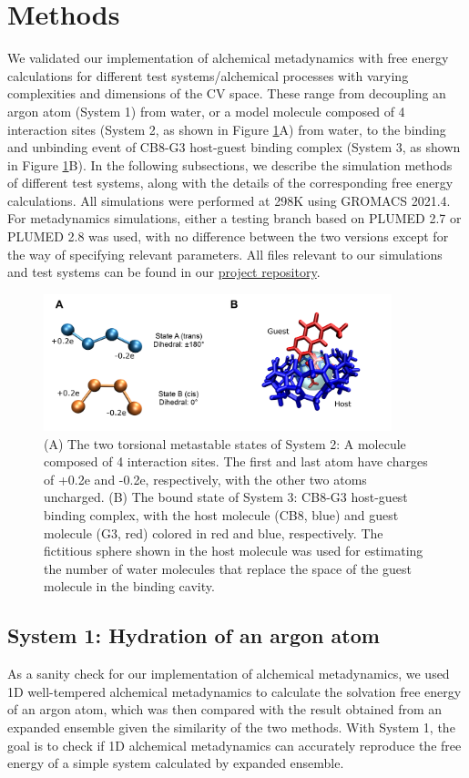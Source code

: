 \documentclass[journal=jacsat,manuscript=article]{achemso}
\begin{document}
\section{Methods}\label{methods}
We validated our implementation of alchemical metadynamics with free energy calculations for different test systems/alchemical processes with varying complexities and dimensions of the CV space. These range from decoupling an argon atom (System 1) from water, or a model molecule composed of 4 interaction sites (System 2, as shown in Figure \ref{test_sys}A) from water, to the binding and unbinding event of CB8-G3 host-guest binding complex (System 3, as shown in Figure \ref{test_sys}B). In the following subsections, we describe the simulation methods of different test systems, along with the details of the corresponding free energy calculations. All simulations were performed at 298K using GROMACS 2021.4. For metadynamics simulations, either a testing branch based on PLUMED 2.7 or PLUMED 2.8 was used, with no difference between the two versions except for the way of specifying relevant parameters. All files relevant to our simulations and test systems can be found in our \href{https://github.com/shirtsgroup/alchemical_MetaD}{project repository}. 

\begin{figure}[ht]
    \centering
    \includegraphics[width=0.9\textwidth]{Figures/sys.png}   
    \caption{(A) The two torsional metastable states of System 2: A molecule composed of 4 interaction sites. The first and last atom have charges of +0.2e and -0.2e, respectively, with the other two atoms uncharged. (B) The bound state of System 3: CB8-G3 host-guest binding complex, with the host molecule (CB8, blue) and guest molecule (G3, red) colored in red and blue, respectively. The fictitious sphere shown in the host molecule was used for estimating the number of water molecules that replace the space of the guest molecule in the binding cavity.}
    \label{test_sys}
\end{figure}

\subsection{System 1: Hydration of an argon atom}
As a sanity check for our implementation of alchemical metadynamics, we used 1D well-tempered alchemical metadynamics to calculate the solvation free energy of an argon atom, which was then compared with the result obtained from an expanded ensemble given the similarity of the two methods. With System 1, the goal is to check if 1D alchemical metadynamics can accurately reproduce the free energy of a simple system calculated by expanded ensemble. 
\end{document}
